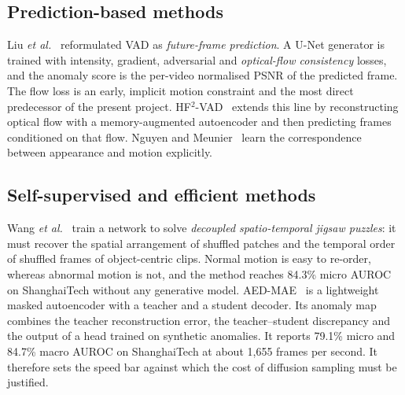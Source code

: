 \documentclass[11pt,a4paper]{article}
\begin{document}
\subsection{Prediction-based methods}
Liu \emph{et al.}~\cite{liu2018future} reformulated VAD as \emph{future-frame prediction}. A U-Net generator is trained with intensity, gradient, adversarial and \emph{optical-flow consistency} losses, and the anomaly score is the per-video normalised PSNR of the predicted frame. The flow loss is an early, implicit motion constraint and the most direct predecessor of the present project. HF$^2$-VAD~\cite{liu2021hybrid} extends this line by reconstructing optical flow with a memory-augmented autoencoder and then predicting frames conditioned on that flow. Nguyen and Meunier~\cite{nguyen2019anomaly} learn the correspondence between appearance and motion explicitly.

\subsection{Self-supervised and efficient methods}
Wang \emph{et al.}~\cite{wang2022jigsaw} train a network to solve \emph{decoupled spatio-temporal jigsaw puzzles}: it must recover the spatial arrangement of shuffled patches and the temporal order of shuffled frames of object-centric clips. Normal motion is easy to re-order, whereas abnormal motion is not, and the method reaches 84.3\% micro AUROC on ShanghaiTech without any generative model. AED-MAE~\cite{ristea2024selfdistilled} is a lightweight masked autoencoder with a teacher and a student decoder. Its anomaly map combines the teacher reconstruction error, the teacher--student discrepancy and the output of a head trained on synthetic anomalies. It reports 79.1\% micro and 84.7\% macro AUROC on ShanghaiTech at about 1,655 frames per second. It therefore sets the speed bar against which the cost of diffusion sampling must be justified.
\end{document}

